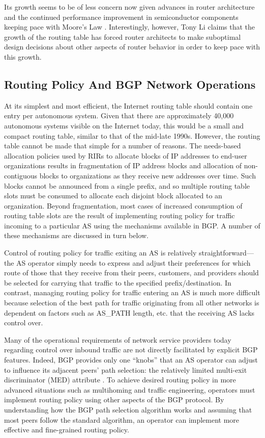 
Its growth seems to be of less concern now given advances in router architecture and the continued performance improvement in semiconductor components keeping pace with Moore's Law \cite{McKeown:2006kx}. Interestingly, however, Tony Li claims that the growth of the routing table has forced router architects to make suboptimal design decisions about other aspects of router behavior in order to keep pace with this growth.

\subsection{Routing Policy And BGP Network Operations}

At its simplest and most efficient, the Internet routing table should contain one entry per autonomous system. Given that there are approximately 40,000 autonomous systems visible on the Internet today, this would be a small and compact routing table, similar to that of the mid-late 1990s. However, the routing table cannot be made that simple for a number of reasons. The needs-based allocation policies used by RIRs \cite{rfc2050} to allocate blocks of IP addresses to end-user organizations results in fragmentation of IP address blocks and allocation of non-contiguous blocks to organizations as they receive new addresses over time. Such blocks cannot be announced from a single prefix, and so multiple routing table slots must be consumed to allocate each disjoint block allocated to an organization. Beyond fragmentation, most cases of increased consumption of routing table slots are the result of implementing routing policy for traffic incoming to a particular AS using the mechanisms available in BGP. A number of these mechanisms are discussed in turn below.

Control of routing policy for traffic exiting an AS is relatively straightforward---the AS operator simply needs to express and adjust their preferences for which route of those that they receive from their peers, customers, and providers should be selected for carrying that traffic to the specified prefix/destination. In contrast, managing routing policy for traffic entering an AS is much more difficult because selection of the best path for traffic originating from all other networks is dependent on factors such as AS\_PATH length, etc. that the receiving AS lacks control over.

Many of the operational requirements of network service providers today regarding control over inbound traffic are not directly facilitated by explicit BGP features. Indeed, BGP provides only one ``knobs'' that an AS operator can adjust to influence its adjacent peers' path selection: the relatively limited multi-exit discriminator (MED) attribute \cite{Beijnum:2002oq}. To achieve desired routing policy in more advanced situations such as multihoming and traffic engineering, operators must implement routing policy using other aspects of the BGP protocol. By understanding how the BGP path selection algorithm works and assuming that most peers follow the standard algorithm, an operator can implement more effective and fine-grained routing policy.

